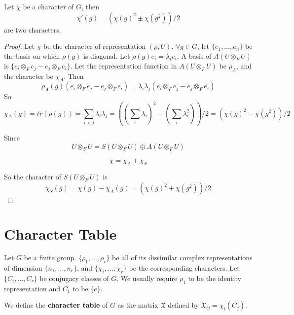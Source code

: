 \documentclass[12pt]{book}
\begin{document}
	\begin{theorem}
		Let $\chi$ be a character of $G$, then
		\begin{equation}
			\chi'(g)=(\chi(g)^2\pm\chi(g^2))/2
		\end{equation}
		are two characters.
		\label{thm:char_sa}
	\end{theorem}
	\begin{proof}
		Let $\chi$ be the character of representation $(\rho,U)$. $\forall g\in G$, let $\{e_1,\dots,e_n\}$ be the basis on which $\rho(g)$ is diagonal. Let $\rho(g)e_i=\lambda_i e_i$. A basis of $A(U\otimes_F U)$ is $\{e_i\otimes_Fe_j-e_j\otimes_Fe_i\}$. Let the representation function in $A(U\otimes_F U)$ be $\rho_A$, and the character be $\chi_A$. Then
		\begin{equation}
			\rho_A(g)(e_i\otimes_Fe_j-e_j\otimes_Fe_i)=\lambda_i\lambda_j(e_i\otimes_Fe_j-e_j\otimes_Fe_i)
		\end{equation}
		So
		\begin{equation}
			\chi_A(g)= tr(\rho(g))=\sum_{i<j}\lambda_i\lambda_j=((\sum_{i}\lambda_i)^2-(\sum_{i}\lambda_i^2))/2=(\chi(g)^2-\chi(g^2))/2
		\end{equation}
		
		Since
		\begin{equation}
			U\otimes_F U=S(U\otimes_F U)\oplus A(U\otimes_F U)
		\end{equation}
		
		\begin{equation}
			\chi=\chi_A+\chi_S
		\end{equation}
		
		So the character of $S(U\otimes_F U)$ is 
		\begin{equation}
			\chi_S(g)=\chi(g)-\chi_A(g)=(\chi(g)^2+\chi(g^2))/2
		\end{equation}
	\end{proof}
	
	\section{Character Table}
	
	Let $G$ be a finite group. $\{\rho_1,\dots,\rho_r\}$ be all of its dissimilar complex representations of dimension $\{n_1,\dots,n_r\}$, and $\{\chi_i,\dots,\chi_r\}$ be the corresponding characters. Let $\{C_i,\dots,C_r\}$ be conjugacy classes of $G$.  We usually require $\rho_1$ to be the identity representation and $C_1$ to be $\{e\}$.
	
	\begin{definition}
		We define the {\bf character table} of $G$ as the matrix $\mathfrak X$ defined by $\mathfrak X_{ij}=\chi_i(C_j)$.
	\end{definition}
	
\end{document}
